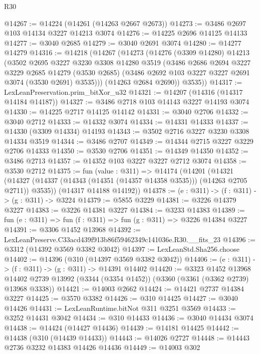 \begin{lexlean}{R30}
\begin{coremodule}
@14267 := @14224 (@14261 (@14263 @2667 @2673))
@14273 := @3486 @2697 @103 @14134 @3227 @14213 @3074
@14276 := @14225 @2696 @14125 @14133
@14277 := @3040 @2685
@14279 := @3040 @2691 @3074
@14280 := @14277 @14279
@14316 := @14218
    (@14267
      (@14273
        (@14276
          (@3309 @14280)
          @14213
          (@3502
            @2695
            @3227
            @3230
            @3308
            @14280
            @3519
            (@3486
              @2686
              @2694
              @3227
              @3229
              @2685
              @14279
              (@3530 @2685)
              (@3486 @2692 @103 @3227 @3227 @2691 @3074 (@3530 @2691) @3535)))
          (@14263 @2684 @2690))
        @3535))
@14317 := LexLeanPreservation.prim_bitXor_u32
@14321 := @14207 (@14316 (@14317 @14184 @14187))
@14327 := @3486 @2718 @103 @14143 @3227 @14193 @3074
@14330 := @14225 @2717 @14125 @14142
@14331 := @3040 @2706
@14332 := @3040 @2712
@14333 := @14332 @3074
@14334 := @14331 @14333
@14337 := @14330 (@3309 @14334) @14193
@14343 := @3502 @2716 @3227 @3230 @3308 @14334 @3519
@14344 := @3486 @2707
@14349 := @14344 @2715 @3227 @3229 @2706 @14333
@14350 := @3530 @2706
@14351 := @14349 @14350
@14352 := @3486 @2713
@14357 := @14352 @103 @3227 @3227 @2712 @3074
@14358 := @3530 @2712
@14375 := fun (value : @311) =>
  @14174
    (@14201
      (@14321 (@14327 (@14337 (@14343 (@14351 (@14357 @14358 @3535))) (@14263 @2705 @2711)) @3535))
      (@14317 @14188 @14192))
@14378 := (e : @311) -> (f : @311) -> (g : @311) -> @3224
@14379 := @5855 @3229
@14381 := @3226 @14379 @3227
@14383 := @3226 @14381 @3227
@14384 := @3233 @14383
@14389 := fun (e : @311) => fun (f : @311) => fun (g : @311) => @3226 @14384 @3227
@14391 := @3306 @1452 @13968
@14392 := LexLeanPreserve.C33acd439f913b86f59462349c141036e.R30.__fits_23
@14396 := @3312 (@14392 @3569 @3382 @3042)
@14397 := LexLeanStd.Sha256.choose
@14402 := @14396 (@310 (@14397 @3569 @3382 @3042))
@14406 := (e : @311) -> (f : @311) -> (g : @311) -> @14391 @14402
@14420 := @3323
    @1452
    @13968
    @14402
    @2739
    @13992
    (@3344 (@3354 @1452))
    (@3360 (@3361 (@3362 @2739) @13968 @3338))
@14421 := @14003 @2662
@14424 := @14421 @2737 @14384 @3227
@14425 := @3570 @3382
@14426 := @310 @14425
@14427 := @3040 @14426
@14431 := LexLeanRuntime.bitNot @311 @3251 @3569
@14433 := @3252 @14431 @3042
@14434 := @310 @14433
@14436 := @3040 @14434 @3074
@14438 := @14424 (@14427 @14436)
@14439 := @14181 @14425
@14442 := @14438 (@310 (@14439 @14433))
@14443 := @14026 @2727
@14448 := @14443 @2736 @3232 @14383 @14426 @14436
@14449 := @14003 @302

\end{coremodule}
\end{lexlean}
